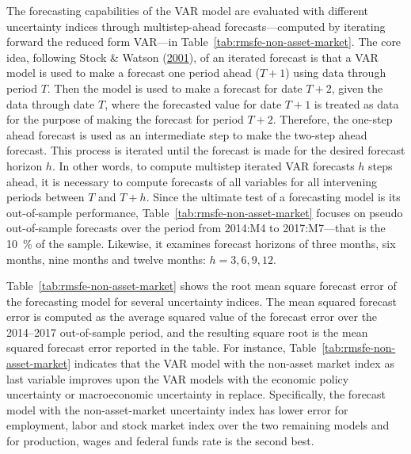 \documentclass[12pt,twoside]{reedthesis}
\begin{document}
The forecasting capabilities of the VAR model are evaluated with different uncertainty indices through multistep-ahead forecasts---computed by iterating forward the reduced form VAR---in Table~\ref{tab:rmsfe-non-asset-market}. The core idea, following Stock \& Watson (\protect\hyperlink{ref-stocwats:2001}{2001}), of an iterated forecast is that a VAR model is used to make a forecast one period ahead (\(T + 1\)) using data through period \(T\). Then the model is used to make a forecast for date \(T + 2\), given the data through date \(T\), where the forecasted value for date \(T + 1\) is treated as data for the purpose of making the forecast for period \(T + 2\). Therefore, the one-step ahead forecast is used as an intermediate step to make the two-step ahead forecast. This process is iterated until the forecast is made for the desired forecast horizon \(h\). In other words, to compute multistep iterated VAR forecasts \(h\) steps ahead, it is necessary to compute forecasts of all variables for all intervening periods between \(T\) and \(T + h\). Since the ultimate test of a forecasting model is its out-of-sample performance, Table~\ref{tab:rmsfe-non-asset-market} focuses on pseudo out-of-sample forecasts over the period from 2014:M4 to 2017:M7---that is the 10~\% of the sample. Likewise, it examines forecast horizons of three months, six months, nine months and twelve months: \(h = 3, 6, 9, 12\).

Table~\ref{tab:rmsfe-non-asset-market} shows the root mean square forecast error of the forecasting model for several uncertainty indices. The mean squared forecast error is computed as the average squared value of the forecast error over the 2014--2017 out-of-sample period, and the resulting square root is the mean squared forecast error reported in the table. For instance, Table~\ref{tab:rmsfe-non-asset-market} indicates that the VAR model with the non-asset market index as last variable improves upon the VAR models with the economic policy uncertainty or macroeconomic uncertainty in replace. Specifically, the forecast model with the non-asset-market uncertainty index has lower error for employment, labor and stock market index over the two remaining models and for production, wages and federal funds rate is the second best.
\end{document}
